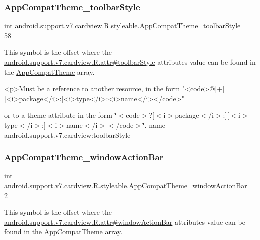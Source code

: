 \subsubsection{\texorpdfstring{App\+Compat\+Theme\+\_\+toolbar\+Style}{AppCompatTheme\_toolbarStyle}}
{\footnotesize\ttfamily int android.\+support.\+v7.\+cardview.\+R.\+styleable.\+App\+Compat\+Theme\+\_\+toolbar\+Style = 58\hspace{0.3cm}{\ttfamily [static]}}

This symbol is the offset where the \hyperlink{classandroid_1_1support_1_1v7_1_1cardview_1_1R_1_1attr_a15aeffa2084d228a200644658187a6cf}{android.\+support.\+v7.\+cardview.\+R.\+attr\#toolbar\+Style} attribute\textquotesingle{}s value can be found in the \hyperlink{classandroid_1_1support_1_1v7_1_1cardview_1_1R_1_1styleable_a52e6f69f954ecc2622d72c0b4d298938}{App\+Compat\+Theme} array.

\begin{DoxyVerb}      <p>Must be a reference to another resource, in the form "<code>@[+][<i>package</i>:]<i>type</i>:<i>name</i></code>"
\end{DoxyVerb}
 or to a theme attribute in the form \char`\"{}$<$code$>$?\mbox{[}$<$i$>$package$<$/i$>$\+:\mbox{]}\mbox{[}$<$i$>$type$<$/i$>$\+:\mbox{]}$<$i$>$name$<$/i$>$$<$/code$>$\char`\"{}.  name android.\+support.\+v7.\+cardview\+:toolbar\+Style \mbox{\label{classandroid_1_1support_1_1v7_1_1cardview_1_1R_1_1styleable_a447b7ac42a9d74fe8464e5d6fdeaba6c}} 
\subsubsection{\texorpdfstring{App\+Compat\+Theme\+\_\+window\+Action\+Bar}{AppCompatTheme\_windowActionBar}}
{\footnotesize\ttfamily int android.\+support.\+v7.\+cardview.\+R.\+styleable.\+App\+Compat\+Theme\+\_\+window\+Action\+Bar = 2\hspace{0.3cm}{\ttfamily [static]}}

This symbol is the offset where the \hyperlink{classandroid_1_1support_1_1v7_1_1cardview_1_1R_1_1attr_a0bad591cfb7bcb7ff02f183bac2401fd}{android.\+support.\+v7.\+cardview.\+R.\+attr\#window\+Action\+Bar} attribute\textquotesingle{}s value can be found in the \hyperlink{classandroid_1_1support_1_1v7_1_1cardview_1_1R_1_1styleable_a52e6f69f954ecc2622d72c0b4d298938}{App\+Compat\+Theme} array.

